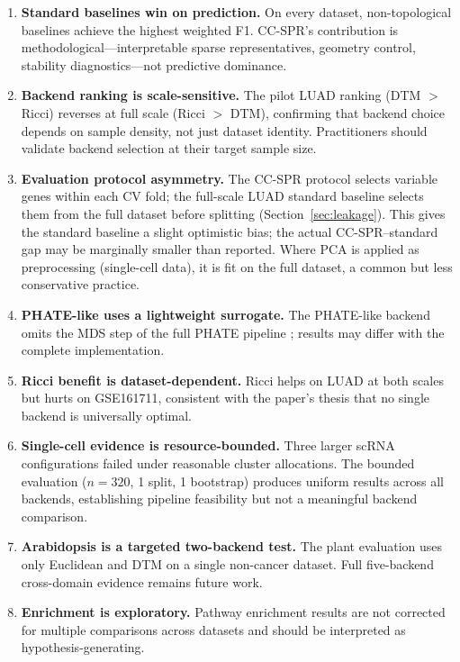 \documentclass[11pt]{article}
\begin{document}
\begin{enumerate}[leftmargin=1.5em]
\item \textbf{Standard baselines win on prediction.}
On every dataset, non-topological baselines achieve the highest weighted F1.
CC-SPR's contribution is methodological---interpretable sparse representatives, geometry control, stability diagnostics---not predictive dominance.

\item \textbf{Backend ranking is scale-sensitive.}
The pilot LUAD ranking (DTM $>$ Ricci) reverses at full scale (Ricci $>$ DTM), confirming that backend choice depends on sample density, not just dataset identity.
Practitioners should validate backend selection at their target sample size.

\item \textbf{Evaluation protocol asymmetry.}
The CC-SPR protocol selects variable genes within each CV fold; the full-scale LUAD standard baseline selects them from the full dataset before splitting (Section~\ref{sec:leakage}).
This gives the standard baseline a slight optimistic bias; the actual CC-SPR--standard gap may be marginally smaller than reported.
Where PCA is applied as preprocessing (single-cell data), it is fit on the full dataset, a common but less conservative practice.

\item \textbf{PHATE-like uses a lightweight surrogate.}
The PHATE-like backend omits the MDS step of the full PHATE pipeline \cite{moon2019phate}; results may differ with the complete implementation.

\item \textbf{Ricci benefit is dataset-dependent.}
Ricci helps on LUAD at both scales but hurts on GSE161711, consistent with the paper's thesis that no single backend is universally optimal.

\item \textbf{Single-cell evidence is resource-bounded.}
Three larger scRNA configurations failed under reasonable cluster allocations.
The bounded evaluation ($n = 320$, 1 split, 1 bootstrap) produces uniform results across all backends, establishing pipeline feasibility but not a meaningful backend comparison.

\item \textbf{Arabidopsis is a targeted two-backend test.}
The plant evaluation uses only Euclidean and DTM on a single non-cancer dataset.
Full five-backend cross-domain evidence remains future work.

\item \textbf{Enrichment is exploratory.}
Pathway enrichment results are not corrected for multiple comparisons across datasets and should be interpreted as hypothesis-generating.
\end{enumerate}
\end{document}
